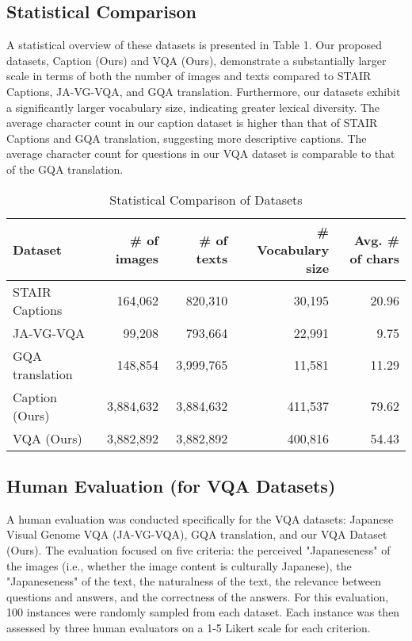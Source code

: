 \documentclass[11pt]{article}
\begin{document}
\subsection{Statistical Comparison}

A statistical overview of these datasets is presented in Table 1. Our proposed datasets, Caption (Ours) and VQA (Ours), demonstrate a substantially larger scale in terms of both the number of images and texts compared to STAIR Captions, JA-VG-VQA, and GQA translation. Furthermore, our datasets exhibit a significantly larger vocabulary size, indicating greater lexical diversity. The average character count in our caption dataset is higher than that of STAIR Captions and GQA translation, suggesting more descriptive captions. The average character count for questions in our VQA dataset is comparable to that of the GQA translation.

\begin{table*}[t]
  \centering
  \caption{Statistical Comparison of Datasets}
  \label{tab:stat_comparison}
  \begin{tabular}{lrrrr}
    \hline
    Dataset         & \# of images & \# of texts & \# Vocabulary size & Avg. \# of chars \\
    \hline
    STAIR Captions  & 164,062      & 820,310     & 30,195             & 20.96            \\
    JA-VG-VQA       & 99,208       & 793,664     & 22,991             & 9.75             \\
    GQA translation & 148,854      & 3,999,765   & 11,581             & 11.29            \\
    Caption (Ours)  & 3,884,632    & 3,884,632   & 411,537            & 79.62            \\
    VQA (Ours)      & 3,882,892    & 3,882,892   & 400,816            & 54.43            \\
    \hline
  \end{tabular}
\end{table*}

\subsection{Human Evaluation (for VQA Datasets)}

A human evaluation was conducted specifically for the VQA datasets: Japanese Visual Genome VQA (JA-VG-VQA), GQA translation, and our VQA Dataset (Ours). The evaluation focused on five criteria: the perceived "Japaneseness" of the images (i.e., whether the image content is culturally Japanese), the "Japaneseness" of the text, the naturalness of the text, the relevance between questions and answers, and the correctness of the answers. For this evaluation, 100 instances were randomly sampled from each dataset. Each instance was then assessed by three human evaluators on a 1-5 Likert scale for each criterion.
\end{document}
